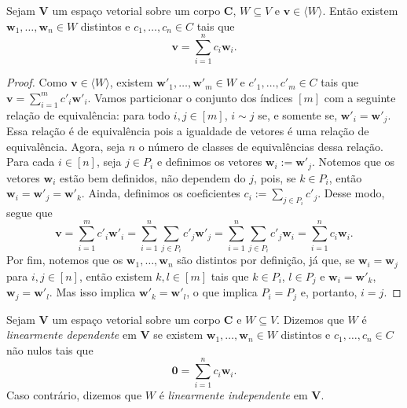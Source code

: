 \begin{proposition}
	Sejam $\bm V$ um espaço vetorial sobre um corpo $\bm C$, $W \subseteq V$ e $\bm v \in \langle W \rangle$. Então existem $\bm w_1, \ldots, \bm w_n \in W$ distintos e $c_1, \ldots, c_n \in C$ tais que
	\begin{equation*}
	\bm v = \sum_{i=1}^n c_i \bm w_i.
	\end{equation*}
\end{proposition}
\begin{proof}
	Como $\bm v \in \langle W \rangle$, existem $\bm w'_1, \ldots, \bm w'_m \in W$ e $c'_1, \ldots, c'_m \in C$ tais que $\bm v = \sum_{i=1}^m c'_i \bm w'_i$. Vamos particionar o conjunto dos índices $[m]$ com a seguinte relação de equivalência: para todo $i,j \in [m]$, $i \sim j$ se, e somente se, $\bm w'_i = \bm w'_j$. Essa relação é de equivalência pois a igualdade de vetores é uma relação de equivalência. Agora, seja $n$ o número de classes de equivalências dessa relação. Para cada $i \in [n]$, seja $j \in P_i$ e definimos os vetores $\bm w_i := \bm w'_j$. Notemos que os vetores $\bm w_i$ estão bem definidos, não dependem do $j$, pois, se $k \in P_i$, então $\bm w_i = \bm w'_j = \bm w'_k$. Ainda, definimos os coeficientes $c_i := \sum _{j \in P_i} c'_j$. Desse modo, segue que
	\begin{equation*}
	\bm v = \sum_{i=1}^m c'_i \bm w'_i = \sum_{i=1}^n \sum_{j \in P_i} c'_j \bm w'_j = \sum_{i=1}^n \sum_{j \in P_i} c'_j \bm w_i =  \sum_{i=1}^n c_i \bm w_i.
	\end{equation*}
	Por fim, notemos que os $\bm w_1, \ldots, \bm w_n$ são distintos por definição, já que, se $\bm w_i = \bm w_j$ para $i,j \in [n]$, então existem $k,l \in [m]$ tais que $k \in P_i$, $l \in P_j$ e $\bm w_i = \bm w'_k$, $\bm w_j = \bm w'_l$. Mas isso implica $\bm w'_k=\bm w'_l$, o que implica $P_i = P_j$ e, portanto, $i = j$.
\end{proof}

\begin{definition}
	Sejam $\bm V$ um espaço vetorial sobre um corpo $\bm C$ e $W \subseteq V$. Dizemos que $W$ é \emph{linearmente dependente} em $\bm V$ se existem $\bm w_1, \ldots,\bm w_n \in W$ distintos e $c_1,\ldots,c_n \in C$ não nulos tais que
	\begin{equation*}
	\bm 0 = \sum_{i=1}^n c_i \bm w_i.
	\end{equation*}
Caso contrário, dizemos que $W$ é \emph{linearmente independente} em $\bm V$.
\end{definition}

